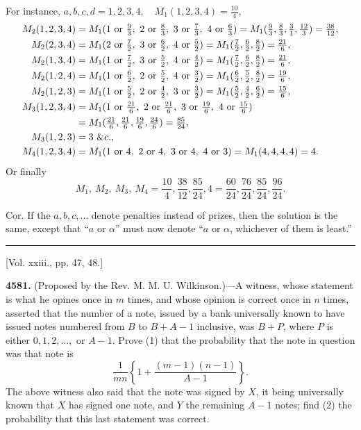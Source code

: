 \documentclass[10pt,twoside]{article}
\begin{document}
For instance, \(a,b,c,d=1,2,3,4,\quad M_1(1,2,3,4)=\frac{10}{4}\),
\[
\begin{aligned}
M_2(1,2,3,4)
 &=M_1(1\hbox{ or }\tfrac93,\ 2\hbox{ or }\tfrac83,\ 3\hbox{ or }\tfrac73,\ 4\hbox{ or }\tfrac63)
  =M_1(\tfrac93,\tfrac83,\tfrac31,\tfrac{12}3)=\tfrac{38}{12},\\
M_2(2,3,4)&=M_1(2\hbox{ or }\tfrac72,\ 3\hbox{ or }\tfrac62,\ 4\hbox{ or }\tfrac52)
  =M_1(\tfrac72,\tfrac62,\tfrac82)=\tfrac{21}6,\\
M_2(1,3,4)&=M_1(1\hbox{ or }\tfrac72,\ 3\hbox{ or }\tfrac52,\ 4\hbox{ or }\tfrac42)
  =M_1(\tfrac72,\tfrac62,\tfrac82)=\tfrac{21}6,\\
M_2(1,2,4)&=M_1(1\hbox{ or }\tfrac62,\ 2\hbox{ or }\tfrac52,\ 4\hbox{ or }\tfrac32)
  =M_1(\tfrac62,\tfrac52,\tfrac82)=\tfrac{19}6,\\
M_2(1,2,3)&=M_1(1\hbox{ or }\tfrac52,\ 2\hbox{ or }\tfrac42,\ 3\hbox{ or }\tfrac32)
  =M_1(\tfrac52,\tfrac42,\tfrac62)=\tfrac{15}6,\\
M_3(1,2,3,4)
 &=M_1(1\hbox{ or }\tfrac{21}6,\ 2\hbox{ or }\tfrac{21}6,\ 3\hbox{ or }\tfrac{19}6,\ 4\hbox{ or }\tfrac{15}6)\\
 &=M_1(\tfrac{21}6,\tfrac{21}6,\tfrac{19}6,\tfrac{24}6)=\tfrac{85}{24},\\
M_3(1,2,3)&=3\ \&c.,\\
M_4(1,2,3,4)&=M_1(1\hbox{ or }4,\ 2\hbox{ or }4,\ 3\hbox{ or }4,\ 4\hbox{ or }3)
  =M_1(4,4,4,4)=4.
\end{aligned}
\]
Or finally
\[
M_1,\ M_2,\ M_3,\ M_4=\frac{10}{4},\frac{38}{12},\frac{85}{24},4
 =\frac{60}{24},\frac{76}{24},\frac{85}{24},\frac{96}{24}.
\]

Cor. If the \(a,b,c,\ldots\) denote penalties instead of prizes, then the
solution is the same, except that ``\(a\) or \(\alpha\)'' must now denote
``\(a\) or \(\alpha\), whichever of them is least.''

\begin{center}
\rule{0.32\linewidth}{0.4pt}

[Vol. xxiii., pp. 47, 48.]
\end{center}

\noindent\textbf{4581.} (Proposed by the Rev. M. M. U. Wilkinson.)---A witness,
whose statement is what he opines once in \(m\) times, and whose opinion is
correct once in \(n\) times, asserted that the number of a note, issued by a
bank universally known to have issued notes numbered from \(B\) to
\(B+A-1\) inclusive, was \(B+P\), where \(P\) is either \(0,1,2,\ldots,\) or
\(A-1\). Prove (1) that the probability that the note in question was that note
is
\[
        \frac1{mn}\left\{1+\frac{(m-1)(n-1)}{A-1}\right\}.
\]
The above witness also said that the note was signed by \(X\), it being
universally known that \(X\) has signed one note, and \(Y\) the remaining
\(A-1\) notes; find (2) the probability that this last statement was correct.
\end{document}
